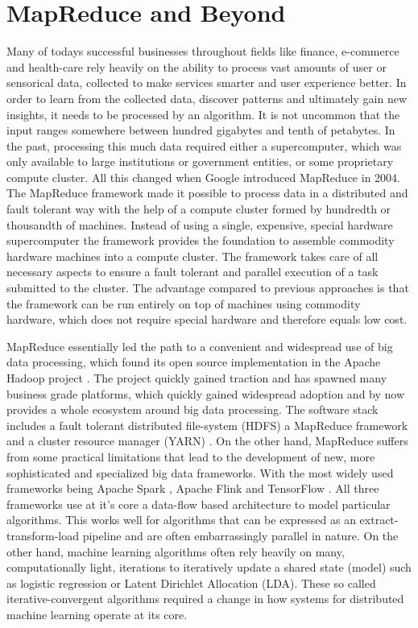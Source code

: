 \section{MapReduce and Beyond}
Many of todays successful businesses throughout fields like finance, e-commerce and health-care rely heavily on the ability to process vast amounts of user or sensorical data, collected to make services smarter and user experience better.
In order to learn from the collected data, discover patterns and ultimately gain new insights, it needs to be processed by an algorithm.
It is not uncommon that the input ranges somewhere between hundred gigabytes and tenth of petabytes.
In the past, processing this much data required either a supercomputer, which was only available to large institutions or government entities, or some proprietary compute cluster.
All this changed when Google introduced MapReduce \cite{Dean2004} in 2004.
The MapReduce framework made it possible to process data in a distributed and fault tolerant way with the help of a compute cluster formed by hundredth or thousandth of machines.
Instead of using a single, expensive, special hardware supercomputer the framework provides the foundation to assemble commodity hardware machines into a compute cluster.
The framework takes care of all necessary aspects to ensure a fault tolerant and parallel execution of a task submitted to the cluster.
The advantage compared to previous approaches is that the framework can be run entirely on top of machines using commodity hardware, which does not require special hardware and therefore equals low cost.

MapReduce essentially led the path to a convenient and widespread use of big data processing, which found its open source implementation in the Apache Hadoop project \cite{hadoop2009hadoop}.
The project quickly gained traction and has spawned many business grade platforms, which quickly gained widespread adoption and by now provides a whole ecosystem around big data processing. The software stack includes a fault tolerant distributed file-system (HDFS) a MapReduce framework and a cluster resource manager (YARN) \cite{KumarVavilapalli2013}.
On the other hand, MapReduce suffers from some practical limitations that lead to the development of new, more sophisticated and specialized big data frameworks. With the most widely used frameworks being Apache Spark \cite{Zaharia2010}, Apache Flink \cite{Alexandrov2014} and TensorFlow \cite{abadi2016tensorflow}.
All three frameworks use at it's core a data-flow based architecture to model particular algorithms.
This works well for algorithms that can be expressed as an extract-transform-load pipeline and are often embarrassingly parallel in nature.
On the other hand, machine learning algorithms often rely heavily on many, computationally light, iterations to iteratively update a shared state (model) such as logistic regression or Latent Dirichlet Allocation (LDA).
These so called iterative-convergent algorithms required a change in how systems for distributed machine learning operate at its core.


